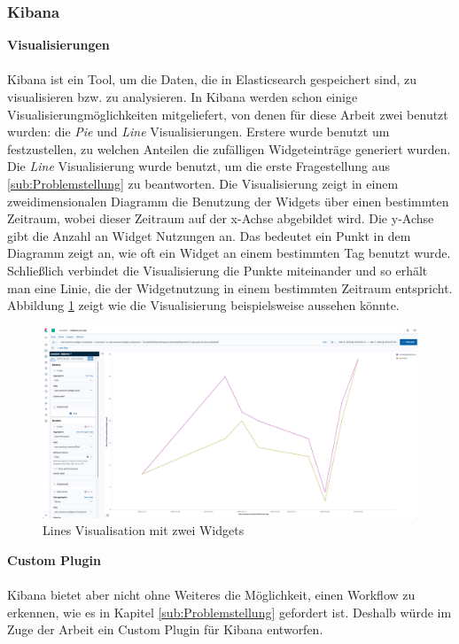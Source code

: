 \subsubsection{Kibana}
\label{ssub:Kibana}
\textbf{Visualisierungen}\\
\\
Kibana ist ein Tool, um die Daten, die in Elasticsearch gespeichert sind, zu visualisieren bzw. zu analysieren. In Kibana werden schon einige Visualisierungmöglichkeiten mitgeliefert, von denen für diese Arbeit zwei benutzt wurden: die \textit{Pie} und \textit{Line} Visualisierungen. Erstere wurde benutzt um festzustellen, zu welchen Anteilen die zufälligen Widgeteinträge generiert wurden.\\
Die \textit{Line} Visualisierung wurde benutzt, um die erste Fragestellung aus \ref{sub:Problemstellung} zu beantworten. Die Visualisierung zeigt in einem zweidimensionalen Diagramm die Benutzung der Widgets über einen bestimmten Zeitraum, wobei dieser Zeitraum auf der x-Achse abgebildet wird. Die y-Achse gibt die Anzahl an Widget Nutzungen an. Das bedeutet ein Punkt in dem Diagramm zeigt an, wie oft ein Widget an einem bestimmten Tag benutzt wurde. Schließlich verbindet die Visualisierung die Punkte miteinander und so erhält man eine Linie, die der Widgetnutzung in einem bestimmten Zeitraum entspricht. Abbildung	\ref{fig:screen_lines} zeigt wie die Visualisierung beispielsweise aussehen könnte.

\begin{figure}[htb]
\begin{center}
	\includegraphics[width=430pt]{bilder/screen_lines.png}
\end{center}
\caption{Lines Visualisation mit zwei Widgets}
\label{fig:screen_lines}
\end{figure}

\textbf{Custom Plugin}\\\\
Kibana bietet aber nicht ohne Weiteres die Möglichkeit, einen Workflow zu erkennen, wie es in Kapitel \ref{sub:Problemstellung} gefordert ist. Deshalb würde im Zuge der Arbeit ein Custom Plugin für Kibana entworfen.
